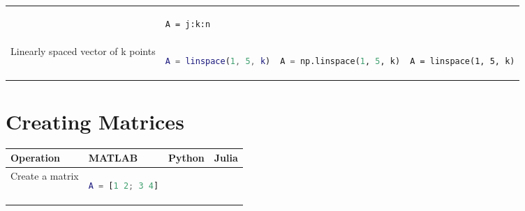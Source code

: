 \documentclass[10pt, landscape]{article}
\begin{document}
\begin{multicols}{2}
\begin{tabular}[]{@{}llll@{}}
\begin{minipage}[t]{0.29\columnwidth}
\end{minipage} & \begin{minipage}[t]{0.19\columnwidth}\raggedright
\begin{lstlisting}
A = j:k:n
\end{lstlisting}

\end{minipage}\tabularnewline
\begin{minipage}[t]{0.21\columnwidth}\raggedright
Linearly spaced vector of k points
\end{minipage} & \begin{minipage}[t]{0.19\columnwidth}\raggedright
\begin{lstlisting}[language=Matlab]
A = linspace(1, 5, k)
\end{lstlisting}

\end{minipage} & \begin{minipage}[t]{0.29\columnwidth}\raggedright
\begin{lstlisting}[language=Python]
A = np.linspace(1, 5, k)
\end{lstlisting}

\end{minipage} & \begin{minipage}[t]{0.19\columnwidth}\raggedright
\begin{lstlisting}
A = linspace(1, 5, k)
\end{lstlisting}

\end{minipage}\tabularnewline
\bottomrule
\end{tabular}

\section{Creating Matrices}\label{creating-matrices}

\begin{tabular}[]{@{}llll@{}}
\toprule
\begin{minipage}[b]{0.24\columnwidth}\raggedright
Operation
\end{minipage} & \begin{minipage}[b]{0.20\columnwidth}\raggedright
MATLAB
\end{minipage} & \begin{minipage}[b]{0.25\columnwidth}\raggedright
Python
\end{minipage} & \begin{minipage}[b]{0.20\columnwidth}\raggedright
Julia
\end{minipage}\tabularnewline
\midrule
\begin{minipage}[t]{0.24\columnwidth}\raggedright
Create a matrix
\end{minipage} & \begin{minipage}[t]{0.20\columnwidth}\raggedright
\begin{lstlisting}[language=Matlab]
A = [1 2; 3 4]
\end{lstlisting}


\end{minipage}
\end{tabular}
\end{multicols}
\end{document}

